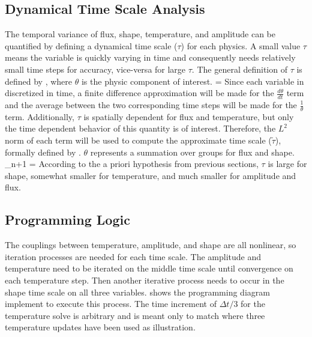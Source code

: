 \subsection{Dynamical Time Scale Analysis}
\label{sect:tau}

The temporal variance of flux, shape, temperature, and amplitude can be quantified by defining a dynamical time scale ($\tau$) for each physics.  A small value $\tau$ means the variable is quickly varying in time and consequently needs relatively small time steps for accuracy, vice-versa for large $\tau$.  The general definition of $\tau$ is defined by , where $\theta$ is the physic component of interest.  
\be
\tau = 
\label{eq:tau1}
\ee
Since each variable in discretized in time, a finite difference approximation will be made for the $\frac{d\theta}{dt}$ term and the average between the two corresponding time steps will be made for the $\frac{1}{\theta}$ term.  Additionally, $\tau$ is spatially dependent for flux and temperature, but only the time dependent behavior of this quantity is of interest.  Therefore, the $L^2$ norm of each term will be used to compute the approximate time scale ($\tilde{\tau}$), formally defined by .  $\theta$ represents a summation over groups for flux and shape.
\be
\tilde{\tau}_{n+1} = 
\label{eq:tau2}
\ee
%
According to the a priori hypothesis from previous sections, $\tau$ is large for shape, somewhat smaller for temperature, and much smaller for amplitude and flux.


\subsection{Programming Logic}

The couplings between temperature, amplitude, and shape are all nonlinear, so iteration processes are needed for each time scale.  The amplitude and temperature need to be iterated on the middle time scale until convergence on each temperature step.  Then another iterative process needs to occur in the shape time scale on all three variables.  shows the programming diagram implement to execute this process. The time increment of $\Delta t/3$ for the temperature solve is arbitrary and is meant only to match  where three temperature updates have been used as illustration.



